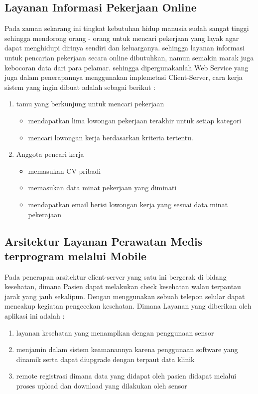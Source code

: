 {\subsection{Layanan Informasi Pekerjaan Online}
Pada zaman sekarang ini tingkat kebutuhan hidup manusia sudah sangat tinggi sehingga mendorong orang - orang
untuk mencari pekerjaan yang layak agar dapat menghidupi dirinya sendiri dan keluarganya. sehingga 
layanan informasi untuk pencarian pekerjaan secara online dibutuhkan, namun semakin marak juga kebocoran
data dari para pelamar. sehingga dipergunakanlah Web Service yang juga dalam penerapannya menggunakan
implemetasi Client-Server, cara kerja sistem yang ingin dibuat adalah sebagai berikut :

\begin{enumerate}
    \item tamu yang berkunjung untuk mencari pekerjaan 
    \begin{itemize}
        \item mendapatkan lima lowongan pekerjaan terakhir untuk setiap kategori
        \item mencari lowongan kerja berdasarkan kriteria tertentu.
    \end{itemize}
    \item Anggota pencari kerja
    \begin{itemize}
        \item memasukan CV pribadi
        \item memasukan data minat pekerjaan yang diminati
        \item mendapatkan email berisi lowongan kerja yang sesuai data minat pekerajaan
    \end{itemize}
\end{enumerate}

\subsection{Arsitektur Layanan Perawatan Medis terprogram melalui Mobile}
Pada penerapan arsitektur client-server yang satu ini bergerak di bidang kesehatan, dimana Pasien dapat melakukan check kesehatan
walau terpantau jarak yang jauh sekalipun. Dengan menggunakan sebuah telepon selular dapat mencakup kegiatan pengecekan kesehatan.
Dimana Layanan yang diberikan oleh aplikasi ini adalah :
\begin{enumerate}
    \item layanan kesehatan yang menamplkan dengan penggunaan sensor
    \item menjamin dalam sistem keamanannya karena penggunaan software yang dinamik serta dapat diupgrade dengan terpaut data klinik
    \item remote registrasi dimana data yang didapat oleh pasien didapat melalui proses upload dan download yang dilakukan oleh sensor
\end{enumerate}

}
